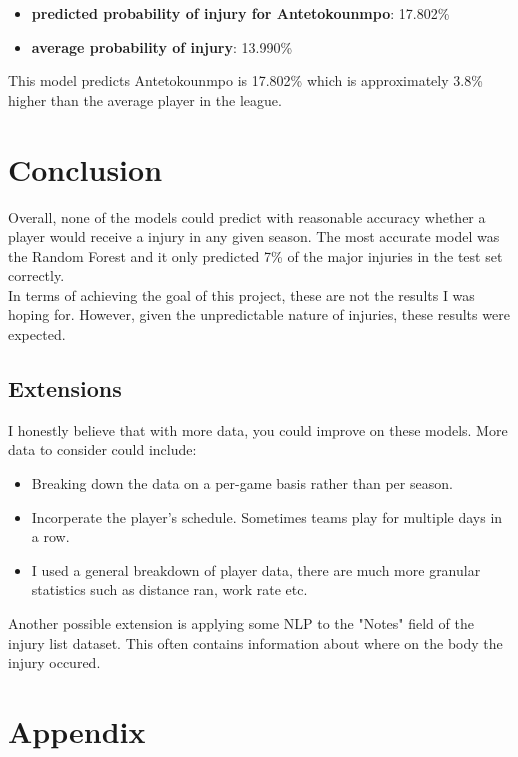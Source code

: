 \documentclass{article}
\begin{document}
\begin{itemize}
    \item \textbf{predicted probability of injury for Antetokounmpo}: 17.802\%
    \item \textbf{average probability of injury}: 13.990\%
\end{itemize}

This model predicts Antetokounmpo is 17.802\% which is approximately 3.8\% higher than the average player in the league.

\section*{Conclusion}

Overall, none of the models could predict with reasonable accuracy whether a player would receive a injury in any given season. 
The most accurate model was the Random Forest and it only predicted 7\% of the 
major injuries in the test set correctly.\\

In terms of achieving the goal of this project, these are not the results
I was hoping for. However, given the unpredictable nature of injuries, these  
results were expected.

\subsection*{Extensions}

I honestly believe that with more data, you could improve on these models. More data to 
consider could include:
\begin{itemize}
    \item Breaking down the data on a per-game basis rather than per season.
    \item Incorperate the player's schedule. Sometimes teams play for multiple days in a row.
    \item I used a general breakdown of player data, there are much more granular statistics such as distance ran, work rate etc.
\end{itemize}

Another possible extension is applying some NLP to the "Notes" field of the injury list
dataset. This often contains information about where on the body the injury occured.

\newpage
\label{appendix:start}\section*{Appendix}
\end{document}
